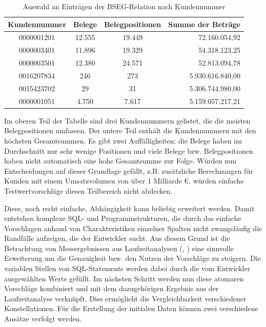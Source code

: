 \begin{table}[ht!]
	\centering
	\begin{tabular}{ |c|c|c|r| }
		\hline
		Kundennummer & Belege & Belegpositionen & Summe der Beträge\\
		\hline
		0000001201 & 12.555 & 19.449 & 72.160.054,92 \\
		0000003401 & 11.896 & 19.329 & 54.318.123,25 \\
		0000003501 & 12.380 & 24.571 & 52.813.094,78 \\
		\hline
		0016207834 & 246 & 273 & 5.930.616.840,00 \\
		0015423702 & 29 & 31 & 5.306.744.980,00 \\
		0000001051 & 4.750 & 7.617 & 5.159.057.217,21 \\
		\hline
	\end{tabular}
	\caption{Auswahl an Einträgen der BSEG-Relation nach Kundennummer}
	\label{tab:vergleichkonstellationen}
\end{table}

Im oberen Teil der Tabelle sind drei Kundennummern gelistet, die die meisten Belegpositionen umfassen.
Der untere Teil enthält die Kundennummern mit den höchsten Gesamtsummen.
Es gibt zwei Auffälligkeiten: die Belege haben im Durchschnitt nur sehr wenige Positionen und viele Belege bzw. Belegpositionen haben nicht automatisch eine hohe Gesamtsumme zur Folge.
Würden nun Entscheidungen auf dieser Grundlage gefällt, z.B. zusätzliche Berechnungen für Kunden mit einem Umsatzvolumen von über 1 Milliarde \euro{}, würden einfache Testwertvorschläge diesen Teilbereich nicht abdecken.

Diese, noch recht einfache, Abhängigkeit kann beliebig erweitert werden.
Damit entstehen komplexe SQL- und Programmstrukturen, die durch das einfache Vorschlagen anhand von Charakteristiken einzelner Spalten nicht zwangsläufig die Randfälle aufzeigen, die der Entwickler sucht.
Aus diesem Grund ist die Betrachtung von Messergebnissen aus Laufzeitanalysen (\cite{Exner2014}, \cite{Mues2014}) eine sinnvolle Erweiterung um die Genauigkeit bzw. den Nutzen der Vorschläge zu steigern.
Die variablen Stellen von SQL-Statements werden dabei durch die vom Entwickler ausgewählten Werte gefüllt.
Im nächsten Schritt werden nun diese atomaren Vorschläge kombiniert und mit dem dazugehörigen Ergebnis aus der Laufzeitanalyse verknüpft.
Dies ermöglicht die Vergleichbarkeit verschiedener Konstellationen.
Für die Erstellung der initialen Daten können zwei verschiedene Ansätze verfolgt werden.

